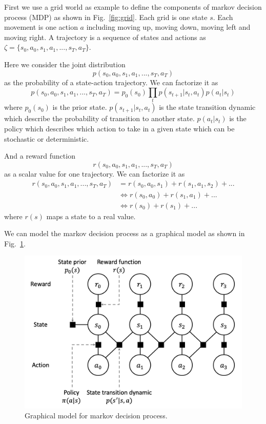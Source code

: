 \documentclass[11pt]{article}
\begin{document}
First we use a grid world as example to define the components of markov decision process (MDP) as shown in Fig.~\ref{fig:grid}. Each grid is one state $s$. Each movement is one action $a$ including moving up, moving down, moving left and moving right. A trajectory is a sequence of states and actions as $\zeta = \{ s_0, a_0, s_1, a_1, ..., s_T, a_T\}$. 


Here we consider the joint distribution
\begin{equation}
    p(s_0, a_0, s_1, a_1, ..., s_T, a_T)
\end{equation}
 as the probability of a state-action trajectory. We can factorize it as
\begin{equation}
    p(s_0, a_0, s_1, a_1, ..., s_T, a_T) = p_0(s_0) \prod_{t} p(s_{t+1}| s_t, a_t) p(a_t|s_t)
\end{equation}
where $p_0(s_0)$ is the prior state. $p(s_{t+1}| s_t, a_t)$ is the state transition dynamic which describe the probability of transition to another state. $p(a_t|s_t)$ is the policy which describes which action to take in a given state which can be stochastic or deterministic. 
 
 And a reward function 
\begin{equation}
    r(s_0, a_0, s_1, a_1, ..., s_T, a_T)
\end{equation}
as a scalar value for one trajectory. We can factorize it as 
\begin{equation}
\begin{split}
    r(s_0, a_0, s_1, a_1, ..., s_T, a_T) & = r(s_0, a_0, s_1) + r(s_1, a_1, s_2) + ... \\
    & \Leftrightarrow r(s_0, a_0) + r(s_1, a_1) + ... \\
    & \Leftrightarrow r(s_0) + r(s_1) + ... 
\end{split}
\end{equation}
where $r(s)$ maps a state to a real value.

We can model the markov decision process as a graphical model as shown in Fig.~\ref{fig:graph}.

\begin{figure}[htbp]
    \centering
\includegraphics[width=12cm]{imgs/graph_model.png}
    \caption{Graphical model for markov decision process.}
    \label{fig:graph}
\end{figure} 
\end{document}
